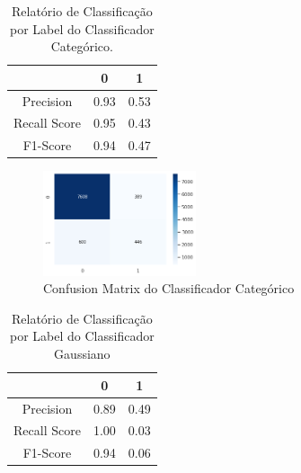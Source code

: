 \documentclass[conference]{IEEEtran}
\begin{document}
\begin{table}[H]

	\centering
    \caption{\label{tab:cr1-cnb} Relatório de Classificação por Label do Classificador Categórico.}
    \begin{small}
        \begin{tabular}{ccc}
        
            \hline
                                    & 0                & 1\\
            \hline
            Precision               & 0.93             & 0.53\\
            Recall Score            & 0.95             & 0.43\\
            F1-Score                & 0.94             & 0.47\\
            
            \hline
        \end{tabular}
    \end{small}

\end{table}

\begin{figure}[H]
\centerline{\includegraphics[width=0.4\textwidth]{IMGS/cm-categorico.png}}

\caption{\label{fig:cm1-cnb}Confusion Matrix do Classificador Categórico}
\end{figure}




\begin{table}[H]

	\centering
    \caption{\label{tab:cr1-gnb} Relatório de Classificação por Label do Classificador Gaussiano}
    \begin{small}
        \begin{tabular}{ccc}
        
            \hline
                                    & 0                & 1\\
            \hline
            Precision                & 0.89             & 0.49\\
            Recall Score            & 1.00             & 0.03\\
            F1-Score                & 0.94             & 0.06\\
            
            \hline
        \end{tabular}
    \end{small}

\end{table}
\end{document}
